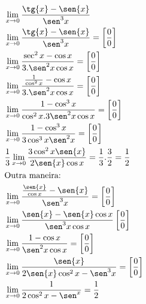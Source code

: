 \begin{ex}
\begin{align}
&\lim_{x\rightarrow 0} \frac{\tg{x}-\sen{x}}{\sen^3{x}}\nonumber\\
&\lim_{x\rightarrow 0} \frac{\tg{x}-\sen{x}}{\sen^3{x}}=\left[\frac{0}{0}\right]\nonumber\\
&\lim_{x\rightarrow 0} \frac{\sec^2{x}-\cos{x}}{3.\sen^2{x}\cos{x}}=\left[\frac{0}{0}\right]\nonumber\\
&\lim_{x\rightarrow 0} \frac{\frac{1}{\cos^2{x}}-\cos{x}}{3.\sen^2{x}\cos{x}}=\left[\frac{0}{0}\right]\nonumber\\
&\lim_{x\rightarrow 0} \frac{1-\cos^3{x}}{\cos^2{x}.3\sen^2{x}\cos{x}}=\left[\frac{0}{0}\right]\nonumber\\
&\lim_{x\rightarrow 0} \frac{1-\cos^3{x}}{3\cos^3{x}\sen^2{x}}=\left[\frac{0}{0}\right]\nonumber\\
&\frac{1}{3} \lim_{x\rightarrow 0} \frac{3\cos^2{x}\sen{x}}{2\sen{x}\cos{x}}=\frac{1}{3}.\frac{3}{2}=\frac{1}{2}\nonumber\\
&\text{Outra maneira:}\nonumber\\
&\lim_{x\rightarrow 0} \frac{\frac{\sen{x}}{\cos{x}}-\sen{x}}{\sen^3{x}}=\left[\frac{0}{0}\right]\nonumber\\
&\lim_{x\rightarrow 0} \frac{\sen{x}-\sen{x}\cos{x}}{\sen^3{x}\cos{x}}\left[\frac{0}{0}\right]\nonumber\\
&\lim_{x\rightarrow 0} \frac{1-\cos{x}}{\sen^2{x}\cos{x}}=\left[\frac{0}{0}\right]\nonumber\\
&\lim_{x\rightarrow 0} \frac{\sen{x}}{2\sen{x}\cos^2{x}-\sen^3{x}}=\left[\frac{0}{0}\right]\nonumber\\
&\lim_{x\rightarrow 0} \frac{1}{2\cos^2{x}-\sen^{x}}=\frac{1}{2}\nonumber
\end{align}
\end{ex}